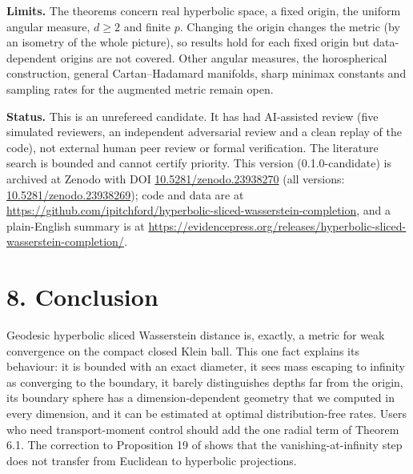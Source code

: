 \documentclass[
  british,
  11pt,
  a4paper,
]{article}
\begin{document}
\textbf{Limits.} The theorems concern real hyperbolic space, a fixed
origin, the uniform angular measure, \(d\geq2\) and finite \(p\).
Changing the origin changes the metric (by an isometry of the whole
picture), so results hold for each fixed origin but data-dependent
origins are not covered. Other angular measures, the horospherical
construction, general Cartan--Hadamard manifolds, sharp minimax
constants and sampling rates for the augmented metric remain open.

\textbf{Status.} This is an unrefereed candidate. It has had AI-assisted
review (five simulated reviewers, an independent adversarial review and
a clean replay of the code), not external human peer review or formal
verification. The literature search is bounded and cannot certify
priority. This version (0.1.0-candidate) is archived at Zenodo with DOI
\href{https://doi.org/10.5281/zenodo.23938270}{10.5281/zenodo.23938270}
(all versions:
\href{https://doi.org/10.5281/zenodo.23938269}{10.5281/zenodo.23938269});
code and data are at
\url{https://github.com/ipitchford/hyperbolic-sliced-wasserstein-completion},
and a plain-English summary is at
\url{https://evidencepress.org/releases/hyperbolic-sliced-wasserstein-completion/}.

\section{8. Conclusion}\label{conclusion}

Geodesic hyperbolic sliced Wasserstein distance is, exactly, a metric
for weak convergence on the compact closed Klein ball. This one fact
explains its behaviour: it is bounded with an exact diameter, it sees
mass escaping to infinity as converging to the boundary, it barely
distinguishes depths far from the origin, its boundary sphere has a
dimension-dependent geometry that we computed in every dimension, and it
can be estimated at optimal distribution-free rates. Users who need
transport-moment control should add the one radial term of Theorem 6.1.
The correction to Proposition 19 of \citet{BDC2025} shows that the
vanishing-at-infinity step does not transfer from Euclidean to
hyperbolic projections.

\renewcommand\refname{References}

\end{document}
